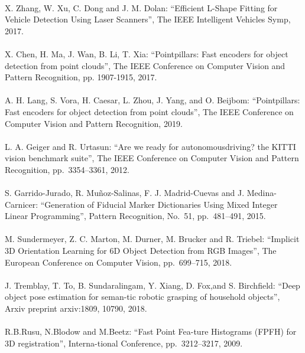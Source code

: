 \begin{mythebibliography}{}
\leavevmode \\ X. Zhang, W. Xu, C. Dong and J. M. Dolan:
\newblock ``Efficient L-Shape Fitting for Vehicle Detection Using Laser Scanners'',
\newblock The IEEE Intelligent Vehicles Symp, 2017.
\\
\leavevmode \\X. Chen, H. Ma, J. Wan, B. Li, T. Xia:
\newblock ``Pointpillars: Fast encoders for object detection from point clouds'',
\newblock The IEEE Conference on Computer Vision and Pattern Recognition, pp. 1907-1915, 2017.
\\
\leavevmode \\A. H. Lang, S. Vora, H. Caesar, L. Zhou, J. Yang, and O. Beijbom:
\newblock ``Pointpillars: Fast encoders for object detection from point clouds'',
\newblock The IEEE Conference on Computer Vision and Pattern Recognition, 2019.
\\


\leavevmode \\L. A. Geiger and R. Urtasun:
\newblock ``Are we ready for autonomousdriving? the KITTI vision benchmark suite'',
\newblock The IEEE Conference on Computer Vision and Pattern Recognition, pp.~3354--3361, 2012.
\\

\leavevmode \\S. Garrido-Jurado, R. Muñoz-Salinas, F. J. Madrid-Cuevas and J. Medina-Carnicer:
\newblock ``Generation of Fiducial Marker Dictionaries Using Mixed Integer Linear Programming'',
\newblock Pattern Recognition, No.~51, pp.~481--491, 2015.
\\

\leavevmode \\M. Sundermeyer, Z. C. Marton, M. Durner, M. Brucker and R. Triebel:
\newblock ``Implicit 3D Orientation Learning for 6D Object Detection from RGB Images'',
\newblock The European Conference on Computer Vision, pp.~699--715, 2018.
\\
\leavevmode \\J. Tremblay, T. To, B. Sundaralingam, Y. Xiang, D. Fox,and S. Birchfield:
\newblock ``Deep object pose estimation for seman-tic robotic grasping of household objects'',
\newblock Arxiv preprint arxiv:1809, 10790, 2018.
\\
\leavevmode \\R.B.Rusu, N.Blodow and M.Beetz:
\newblock ``Fast Point Fea-ture Histograms (FPFH) for 3D registration'',
\newblock Interna-tional Conference, pp.~3212--3217, 2009.
\\


\end{mythebibliography}
